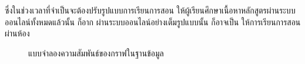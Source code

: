 \documentclass[conference]{IEEEtran}
\begin{document}
    ซึ่งในช่วงเวลาที่จำเป็นจะต้องปรับรูปแบบการเรียนการสอน 
    ให้ผู้เรียนศึกษาเนื้อหาหลักสูตรผ่านระบบออนไลน์ทั้งหมดแล้วนั้น ก็อาก
    ผ่านระบบออนไลน์อย่างเต็มรูปแบบนั้น ก็อาจเป็น
    ให้การเรียนการสอนผ่านห้อง

    \begin{figure}[htbp]
        \caption{แบบจำลองความสัมพันธ์ของกราฟในฐานข้อมูล}
        \label{fig:graph-modeling}
    \end{figure}

    
    
\end{document}
